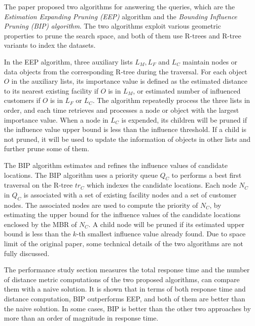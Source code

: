\documentclass[paper=a4, fontsize=18pt]{article} %
\numberwithin{equation}{section} %
\numberwithin{figure}{section} %
\numberwithin{table}{section} %
\begin{document}
The paper proposed two algorithms for answering the queries, which are the \emph{Estimation Expanding Pruning (EEP)} algorithm and the \emph{Bounding Influence Pruning (BIP) algorithm}. The two algorithms exploit various geometric properties to prune the search space, and both of them use R-trees and R-tree variants to index the datasets.

In the EEP algorithm, three auxiliary lists $L_M, L_F$ and $L_C$ maintain nodes or data objects from the corresponding R-tree during the traversal. For each object $O$ in the auxiliary lists, its importance value is defined as the estimated distance to its nearest existing facility if $O$ is in $L_M$, or estimated number of influenced customers if $O$ is in $L_F$ or $L_C$. The algorithm repeatedly process the three lists in order, and each time retrieves and processes a node or object with the largest importance value. When a node in $L_C$ is expended, its children will be pruned if the influence value upper bound is less than the influence threshold. If a child is not pruned, it will be used to update the information of objects in other lists and further prune some of them.

The BIP algorithm estimates and refines the influence values of candidate locations. %
The BIP algorithm uses a priority queue $Q_C$ to performs a best first traversal on the R-tree $tr_C$ which indexes the candidate locations. Each node $N_C$ in $Q_C$ is associated with a set of existing facility nodes and a set of customer nodes. The associated nodes are used to compute the priority of $N_C$, by estimating the upper bound for the influence values of the candidate locations enclosed by the MBR of $N_C$. A child node will be pruned if its estimated upper bound is less than the $k$-th smallest influence value already found. Due to space limit of the original paper, some technical details of the two algorithms are not fully discussed.

The performance study section measures the total response time and the number of distance metric computations of the two proposed algorithms, can compare them with a naive solution. It is shown that in terms of both response time and distance computation, BIP outperforms EEP, and both of them are better than the naive solution. In some cases, BIP is better than the other two approaches by more than an order of magnitude in response time.
\end{document}

